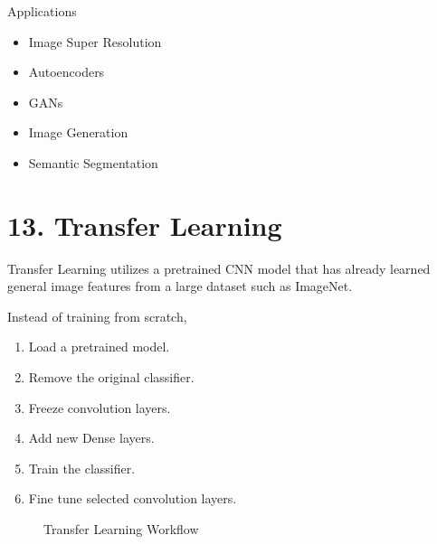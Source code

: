 \documentclass[11pt]{article}
\begin{document}
Applications

\begin{itemize}
\item Image Super Resolution
\item Autoencoders
\item GANs
\item Image Generation
\item Semantic Segmentation
\end{itemize}


\section*{13. Transfer Learning}

Transfer Learning utilizes a pretrained CNN model that has already learned
general image features from a large dataset such as ImageNet.

Instead of training from scratch,

\begin{enumerate}
\item Load a pretrained model.
\item Remove the original classifier.
\item Freeze convolution layers.
\item Add new Dense layers.
\item Train the classifier.
\item Fine tune selected convolution layers.
\end{enumerate}

\begin{figure}[H]

\centering


\caption{Transfer Learning Workflow}

\end{figure}
\end{document}
